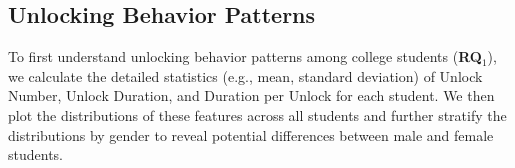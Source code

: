 
\subsection{Unlocking Behavior Patterns}
\label{sec:data:distribution}
\vspace{-2pt}
To first understand unlocking behavior patterns among college students (\textbf{RQ$_1$}), we calculate the detailed statistics (e.g., mean, standard deviation) of {Unlock Number}, {Unlock Duration}, and {Duration per Unlock} for each student. We then plot the distributions of these features across all students and further stratify the distributions by gender to reveal potential differences between male and female students.





